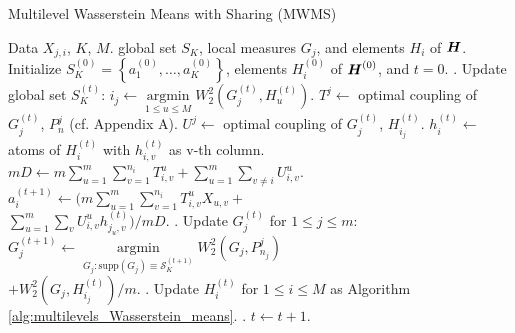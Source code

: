 \setcounter{algorithm}{1}
\begin{algorithm}[tbp]
   \caption{Multilevel Wasserstein Means with Sharing (MWMS)}
   \label{alg:local_constraint_multilevels_Wasserstein_means}
\begin{algorithmic}
    Data $X_{j,i}$, $K$, $M$.
    global set $S_{K}$, local measures $G_{j}$, and elements $H_{i}$ of $\boldsymbol{H}$.
   \STATE Initialize $S_{K}^{(0)}=\left\{a_{1}^{(0)},\ldots,a_{K}^{(0)}\right\}$, elements $H_{i}^{(0)}$ of $\boldsymbol{H}^{(0)}$, and $t = 0$.
   . Update global set $S_{K}^{(t)}$:
   \STATE $i_{j} \leftarrow \mathop {\arg \min}\limits_{1 \leq u \leq M}{W_{2}^{2}(G_{j}^{(t)},H_{u}^{(t)})}$.
   \STATE $T^{j} \leftarrow$ optimal coupling of $G_{j}^{(t)}$, $P_{n}^{j}$ (cf. Appendix A).
   \STATE $U^{j} \leftarrow$ optimal coupling of $G_{j}^{(t)}$, $H_{i_{j}}^{(t)}$.
   \ENDFOR
   \STATE $h_{i}^{(t)} \leftarrow$ atoms of $H_{i}^{(t)}$ with $h_{i,v}^{(t)}$ as v-th column.
   \ENDFOR
   \STATE $m D \leftarrow m \sum \limits_{u=1}^{m}{\sum \limits_{v=1}^{n_{i}}{T_{i,v}^{u}}}+\sum \limits_{u=1}^{m}{\sum \limits_{v \neq i}{U_{i,v}^{u}}}$.
   \STATE $a_{i}^{(t+1)} \leftarrow \biggr(m \sum \limits_{u=1}^{m}{\sum \limits_{v=1}^{n_{i}}{T_{i,v}^{u}X_{u,v}}}+$\\
$\sum \limits_{u=1}^{m}{\sum \limits_{v}{U_{i,v}^{u}h_{j_{u},v}^{(t)}}}\biggr)/mD$.
	\ENDFOR
	. Update $G_{j}^{(t)}$ for $1 \leq j \leq m$:
	\STATE $G_{j}^{(t+1)} \leftarrow \mathop {\arg \min}\limits_{G_{j}: \text{supp}(G_{j}) \equiv \mathcal{S}_{K}^{(t+1)}}{W_{2}^{2}(G_{j},P_{n_{j}}^{j})}$ \\
	$+W_{2}^{2}(G_{j},H_{i_{j}}^{(t)})/m$.
	\ENDFOR
   . Update $H_{i}^{(t)}$ for $1 \leq i \leq M$ as Algorithm \ref{alg:multilevels_Wasserstein_means}.
   . $t \leftarrow t+1$.
   \ENDWHILE
\end{algorithmic}
\end{algorithm}

